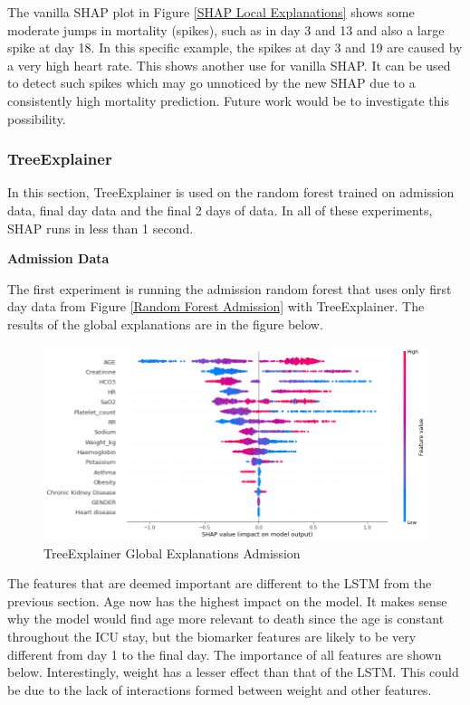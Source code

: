 \documentclass[12pt]{article}
\begin{document}
The vanilla SHAP plot in Figure \ref{SHAP Local Explanations} shows some moderate jumps in mortality (spikes), such as in day 3 and 13 and also a large spike at day 18. In this specific example, the spikes at day 3 and 19 are caused by a very high heart rate. This shows another use for vanilla SHAP. It can be used to detect such spikes which may go unnoticed by the new SHAP due to a consistently high mortality prediction. Future work would be to investigate this possibility. 


\subsubsection{TreeExplainer}

In this section, TreeExplainer is used on the random forest trained on admission data, final day data and the final 2 days of data. In all of these experiments, SHAP runs in less than 1 second.

\textbf{Admission Data}

The first experiment is running the admission random forest that uses only first day data from Figure \ref{Random Forest Admission} with TreeExplainer. The results of the global explanations are in the figure below.

\begin{figure}[H]
\centering\caption{TreeExplainer Global Explanations Admission}
\includegraphics[scale=0.4]{TreeExplainer Admission1 Global.png}
\end{figure}
The features that are deemed important are different to the LSTM from the previous section. Age now has the highest impact on the model. It makes sense why the model would find age more relevant to death since the age is constant throughout the ICU stay, but the biomarker features are likely to be very different from day 1 to the final day. The importance of all features are shown below. Interestingly, weight has a lesser effect than that of the LSTM. This could be due to the lack of interactions formed between weight and other features.
\end{document}
